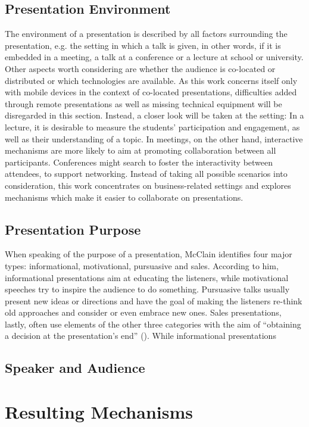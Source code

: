 \subsection{Presentation Environment}
The environment of a presentation is described by all factors surrounding the presentation, e.g. the setting in which a talk is given, in other words, if it is embedded in a meeting, a talk at a conference or a lecture at school or university. Other aspects worth considering are whether the audience is co-located or distributed or which technologies are available. As this work concerns itself only with mobile devices in the context of co-located presentations, difficulties added through remote presentations as well as missing technical equipment will be disregarded in this section. Instead, a closer look will be taken at the setting: In a lecture, it is desirable to measure the students' participation and engagement, as well as their understanding of a topic. In meetings, on the other hand, interactive mechanisms are more likely to aim at promoting collaboration between all participants. Conferences might search to foster the interactivity between attendees, to support networking. Instead of taking all possible scenarios into consideration, this work concentrates on business-related settings and explores mechanisms which make it easier to collaborate on presentations.

\subsection{Presentation Purpose}
When speaking of the purpose of a presentation, McClain \cite{McClain:TypeOfPresentations} identifies four major types: informational, motivational, pursuasive and sales. According to him, informational presentations aim at educating the listeners, while motivational speeches try to inspire the audience to do something. Pursuasive talks usually present new ideas or directions and have the goal of making the listeners re-think old approaches and consider or even embrace new ones. Sales presentations, lastly, often use elements of the other three categories with the aim of ``obtaining a decision at the presentation's end'' (\cite{McClain:TypeOfPresentations}). While informational presentations 

\subsection{Speaker and Audience}

\section{Resulting Mechanisms}